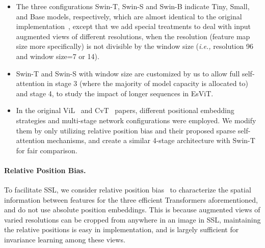 \documentclass{article} \usepackage{iclr2022_conference,times}
\newcommand{\ie}[0]{\emph{i.e., }}
\newcommand{\shortname}{EsViT}
\begin{document}
\begin{minipage}{0.99\textwidth}
\centering

\begin{itemize}[leftmargin=5.5mm]
\item The three configurations Swin-T, Swin-S and Swin-B indicate Tiny, Small, and Base models, respectively, which are almost identical to the original implementation~\citep{liu2021Swin}, except that we add special treatments to deal with input augmented views of different resolutions, when the resolution (feature map size more specifically) is not divisible by the window size (\ie resolution 96 and window size=7 or 14).
\item Swin-T and Swin-S with window size  are customized by us to allow full self-attention in stage 3 (where the majority of model capacity is allocated to) and stage 4, to study the impact of longer sequences in \shortname{}.
\item In the original ViL~\citep{zhang2021vil} and CvT~\citep{wu2021cvt} papers, different positional embedding strategies and multi-stage network configurations were employed. We modify them by only utilizing relative position bias and their proposed sparse self-attention mechanisms, and create a similar 4-stage architecture with Swin-T for fair comparison.
\end{itemize}
\end{minipage}

\paragraph{Relative Position Bias.} To facilitate SSL, we consider relative position bias~\citep{liu2021Swin} to characterize the spatial information between features for the three efficient Transformers aforementioned, and do not use absolute position embeddings. This is because augmented views of varied resolutions can be cropped from anywhere in an image in SSL,  maintaining the relative positions is easy in implementation, and is largely sufficient for invariance learning among these views. 
\end{document}
